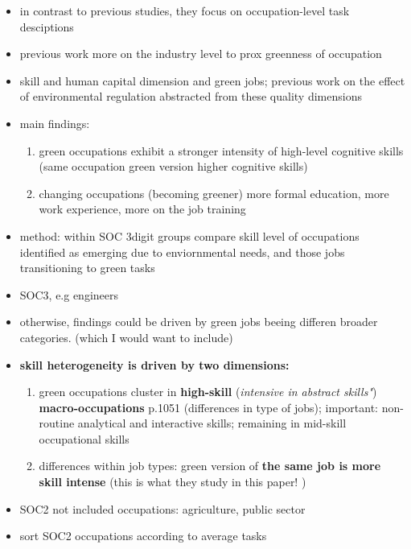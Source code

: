 \begin{itemize}
	\item in contrast to previous studies, they focus on occupation-level task desciptions
	\item previous work more on the industry level to prox greenness of occupation 
	\item skill and human capital dimension and green jobs; previous work on the effect of environmental regulation abstracted from these quality dimensions
	\item main findings:
	\begin{enumerate}
		\item green occupations exhibit a stronger intensity of high-level cognitive skills (\ar same occupation green version higher cognitive skills)
		\item changing occupations (becoming greener) more formal education, more work experience, more on the job training
	\end{enumerate}
\item method: within SOC 3digit groups compare skill level of occupations identified as emerging due to enviornmental needs, and those jobs transitioning to green tasks
\item SOC3, e.g engineers
\item otherwise, findings could be driven by green jobs beeing differen broader categories. (which I would want to include)
\item \textbf{skill heterogeneity is driven by two dimensions: }
\begin{enumerate}
	\item green occupations cluster in \textbf{high-skill} (\textit{intensive in abstract skills"}) \textbf{macro-occupations} p.1051 (\ar differences in type of jobs); important: non-routine analytical and interactive skills; remaining in mid-skill occupational skills
	\item differences within job types: green version of \textbf{the same job is more skill intense} (this is what they study in this paper! )
\end{enumerate}
\item SOC2 not included occupations: agriculture, public sector
\item sort SOC2 occupations according to average tasks



\end{itemize}
